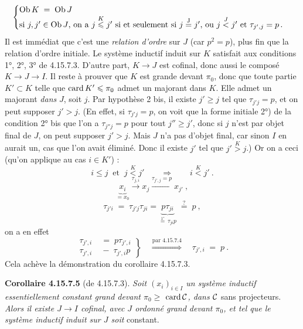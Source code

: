 \[
\begin{cases}
\operatorname{Ob} K \;=\; \operatorname{Ob} J \\
\text{si } j,j' \in \operatorname{Ob} J\text{, on a } j \overset{K}{\leqslant} j' \text{ si et seulement si } j \overset{\mathrm{J}}{=} j'\text{, ou } j \overset{J}{<} j' \text{ et } \tau_{j',j} = p\,.
\end{cases}
\]
Il est immédiat que c'est une \textit{relation d'ordre} sur $J$ (car $p^2 = p$), plus fin que la relation d'ordre initiale. Le système inductif induit sur $K$ satisfait aux conditions 1°, 2°, 3° de 4.15.7.3. D'autre part, $K \longrightarrow J$ est cofinal, donc aussi le composé $K \longrightarrow J \longrightarrow I$. Il reste à prouver que $K$ est grande devant $\pi_0$, donc que toute partie $K' \subset K$ telle que $\operatorname{card} K' \leqslant \pi_0$ admet un majorant dans $K$. Elle admet un majorant \textit{dans} $J$, soit $j$. Par hypothèse 2 bis, il existe $j' \geqslant j$ tel que $\tau_{j'j} = p$, et on peut supposer $j' > j$. (En effet, si $\tau_{j'j} = p$, on voit que
la forme initiale 2°) de la condition 2° bis que l'on a $\tau_{j''j} = p$ pour tout $j'' \geqslant j'$, donc si $j$ n'est par objet final de $J$, %
on peut supposer $j' > j$. Mais $J$ n'a pas d'objet final, car sinon $I$ en aurait un, cas que l'on avait éliminé. Donc il existe $j'$ tel que $j' \overset{K}{>} j$.) Or on a ceci (qu'on applique au cas $i \in K'$) :
\[
i \leqslant j \ \text{ et } \ j \overset{K}{<} j' \qquad \Longrightarrow \qquad i \overset{K}{<} j'\ .
\]
\[
\underbrace{x_i}_{= x_0} \xrightarrow{\tau_{j,i}} x_j \xrightarrow{\tau_{j',j}=p} x_{j'}\ ,
\]
\[
\tau_{j'i} \;=\; \tau_{j'j}\tau_{ji} = \underbrace{p\tau_{ji}}_{\overset{\text{1°}}{=}\,\tau_{ji}p} \;\overset{?}{=}\; p\ ,
\]
on a en effet
\[
\left.
\begin{aligned}
\tau_{j',i} &\;=\; p\tau_{j',i} \\
\tau_{j',i} &\;-\; \tau_{j',i}p %
\end{aligned}
\right\}
\quad \overset{\text{par 4.15.7.4}}{\Longrightarrow} \quad %
\tau_{j',i} \;=\; p\ .
\]
Cela achève la démonstration du corollaire 4.15.7.3.

\textbf{Corollaire 4.15.7.5} (de 4.15.7.3). \textit{Soit $(x_i)_{i\in I}$ un système inductif essentiellement constant grand devant $\pi_0 \geqslant$} $\operatorname{card}\mathcal{C}$\textit{, dans $\mathcal{C}$} sans projecteurs. \textit{Alors il existe $J \longrightarrow I$ cofinal, avec $J$ ordonné grand devant $\pi_0$, et tel que le système inductif induit sur $J$ soit} constant.

